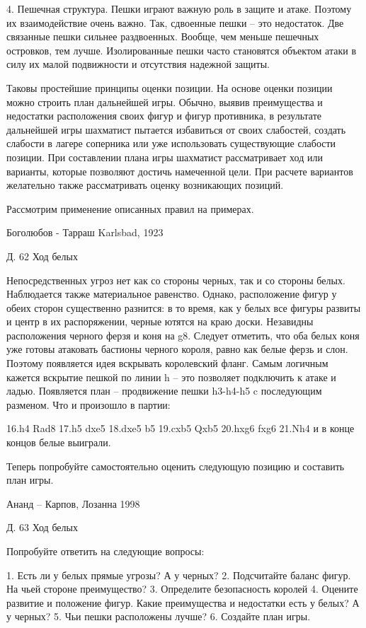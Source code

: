 4.	Пешечная структура. Пешки играют важную роль в защите и атаке. Поэтому их взаимодействие очень важно. Так, сдвоенные пешки – это недостаток. Две связанные пешки сильнее раздвоенных. Вообще, чем меньше пешечных островков, тем лучше. Изолированные пешки часто становятся объектом атаки в силу их малой подвижности и отсутствия надежной защиты.

Таковы простейшие принципы оценки позиции. На основе оценки позиции можно строить план дальнейшей игры. Обычно, выявив преимущества и недостатки расположения своих фигур и фигур противника, в результате дальнейшей игры шахматист пытается избавиться от своих слабостей, создать слабости в лагере соперника или уже использовать существующие слабости позиции. При составлении плана игры шахматист рассматривает ход или варианты, которые позволяют достичь намеченной цели. При расчете вариантов желательно также рассматривать оценку возникающих позиций.

Рассмотрим применение описанных правил на примерах.

Боголюбов - Тарраш
Karlsbad, 1923
 
Д. 62 Ход белых

Непосредственных угроз нет как со стороны черных, так и со стороны белых. Наблюдается также материальное равенство. Однако, расположение фигур у обеих сторон существенно разнится: в то время, как у белых все фигуры развиты и центр в их распоряжении, черные ютятся на краю доски. Незавидны расположения черного ферзя и коня на g8. Следует отметить, что оба белых коня уже готовы атаковать бастионы черного короля, равно как белые ферзь и слон. Поэтому появляется идея вскрывать королевский фланг. Самым логичным кажется вскрытие пешкой по линии h – это позволяет подключить к атаке и ладью. Появляется план – продвижение пешки h3-h4-h5 c последующим разменом. 
Что и произошло в партии:

16.h4 Rad8 17.h5 dxe5 18.dxe5 b5 19.cxb5 Qxb5 20.hxg6 fxg6 21.Nh4 и в конце концов белые выиграли.

Теперь попробуйте самостоятельно оценить следующую позицию и составить план игры.

Ананд – Карпов, 
Лозанна 1998
 
Д. 63 Ход белых

Попробуйте ответить на следующие вопросы:

1.	Есть ли у белых прямые угрозы? А у черных?
2.	Подсчитайте баланс фигур. На чьей стороне преимущество?
3.	Определите безопасность королей
4.	Оцените развитие и положение фигур. Какие преимущества и недостатки есть у белых? А у черных?
5.	Чьи пешки расположены лучше?
6.	Создайте план игры.


